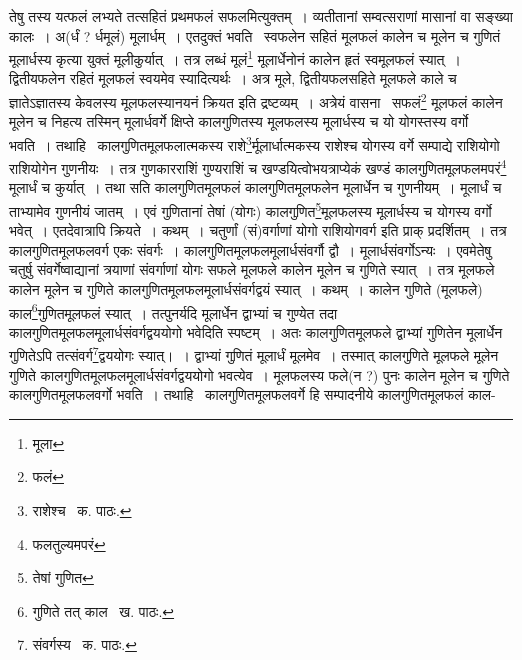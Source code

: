 \documentclass[11pt, openany]{book}
\begin{document}
\noindent तेषु तस्य यत्फलं लभ्यते तत्सहितं प्रथमफलं सफलमित्युक्तम्~। व्यतीतानां सम्वत्सराणां मासानां वा सङ्ख्या कालः~। अ(र्धं ? र्धमूलं) मूलार्धम्~। एतदुक्तं भवति \textendash\ स्वफलेन सहितं मूलफलं कालेन च मूलेन च गुणितं मूलार्धस्य कृत्या युक्तं मूलीकुर्यात्~। तत्र लब्धं मूलं\renewcommand{\thefootnote}{१}\footnote{मूला} मूलार्धेनोनं कालेन हृतं स्वमूलफलं स्यात्~। द्वितीयफलेन रहितं मूलफलं स्वयमेव स्यादित्यर्थः~। अत्र मूले, द्वितीयफलसहिते मूलफले काले च ज्ञातेऽज्ञातस्य केवलस्य मूलफलस्यानयनं क्रियत इति द्रष्टव्यम्~। अत्रेयं वासना \textendash\ सफलं\renewcommand{\thefootnote}{२}\footnote{फलं} मूलफलं कालेन मूलेन च निहत्य तस्मिन् मूलार्धवर्गे क्षिप्ते कालगुणितस्य मूलफलस्य मूलार्धस्य च यो योगस्तस्य वर्गो भवति~। तथाहि \textendash\ कालगुणितमूलफलात्मकस्य राशे\renewcommand{\thefootnote}{३}\footnote{राशेश्च \textendash\ क. पाठः.}र्मूलार्धात्मकस्य राशेश्च योगस्य वर्गे सम्पाद्ये राशियोगो राशियोगेन गुणनीयः~। तत्र गुणकारराशिं गुण्यराशिं च खण्डयित्वोभयत्राप्येकं खण्डं कालगुणितमूलफलमपरं\renewcommand{\thefootnote}{४}\footnote{फलतुल्यमपरं} मूलार्धं च कुर्यात्~। तथा सति कालगुणितमूलफलं कालगुणितमूलफलेन मूलार्धेन च गुणनीयम्~। मूलार्धं च ताभ्यामेव गुणनीयं जातम्~। एवं गुणितानां तेषां (योगः) कालगुणित\renewcommand{\thefootnote}{५}\footnote{तेषां गुणित}मूलफलस्य मूलार्धस्य च योगस्य वर्गो भवेत्~। एतदेवात्रापि क्रियते~। कथम्~। चतुर्णां (सं)वर्गाणां योगो राशियोगवर्ग इति प्राक् प्रदर्शितम्~। तत्र कालगुणितमूलफलवर्ग एकः संवर्गः~। कालगुणितमूलफलमूलार्धसंवर्गौ द्वौ~। मूलार्धसंवर्गोऽन्यः~। एवमेतेषु चतुर्षु संवर्गेष्वाद्यानां त्रयाणां संवर्गाणां योगः सफले मूलफले कालेन मूलेन च गुणिते स्यात्~। तत्र मूलफले कालेन मूलेन च गुणिते कालगुणितमूलफलमूलार्धसंवर्गद्वयं स्यात्~। कथम्~। कालेन गुणिते (मूलफले) काल\renewcommand{\thefootnote}{६}\footnote{गुणिते तत् काल \textendash\ ख. पाठः.}गुणितमूलफलं स्यात्~। तत्पुनर्यदि मूलार्धेन द्वाभ्यां च गुण्येत तदा कालगुणितमूलफलमूलार्धसंवर्गद्वययोगो भवेदिति स्पष्टम्~। अतः कालगुणितमूलफले द्वाभ्यां गुणितेन मूलार्धेन गुणितेऽपि तत्संवर्ग\renewcommand{\thefootnote}{७}\footnote{संवर्गस्य \textendash\ क. पाठः.}द्वययोगः स्यात्।~। द्वाभ्यां गुणितं मूलार्धं मूलमेव~। तस्मात् कालगुणिते मूलफले मूलेन गुणिते कालगुणितमूलफलमूलार्धसंवर्गद्वययोगो भवत्येव~। मूलफलस्य फले(न ?) पुनः कालेन मूलेन च गुणिते कालगुणितमूलफलवर्गो भवति~। तथाहि \textendash\ कालगुणितमूलफलवर्गे हि सम्पादनीये कालगुणितमूलफलं काल-

\newpage
\end{document}
